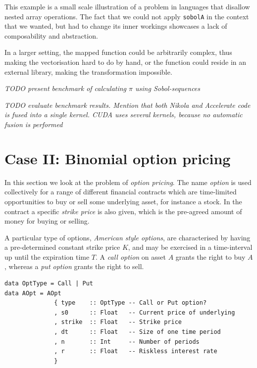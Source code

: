 \documentclass[preprint]{sigplanconf}
\begin{document}
This example is a small scale illustration of a problem in languages
that disallow nested array operations. The fact that we could not
apply \verb|sobolA| in the context that we wanted, but had to change
its inner workings showcases a lack of composability and abstraction. %

In a larger setting, the mapped function could be arbitrarily complex,
thus making the vectorisation hard to do by hand, or the function could
reside in an external library, making the transformation impossible.


\emph{TODO present benchmark of calculating $\pi$ using Sobol-sequences}

\emph{TODO evaluate benchmark results. Mention that both Nikola and
  Accelerate code is fused into a single kernel. CUDA uses several
  kernels, because no automatic fusion is performed}

\section{Case II: Binomial option pricing}
In this section we look at the problem of \emph{option pricing}. The
name \emph{option} is used collectively for a range of different
financial contracts which are time-limited opportunities to buy or
sell some underlying asset, for instance a stock. In the contract a
specific \emph{strike price} is also given, which is the pre-agreed
amount of money for buying or selling.

A particular type of options, \emph{American style options}, are
characterised by having a pre-determined constant strike price $K$,
and may be exercised in a time-interval up until the expiration time
$T$. A \emph{call option} on asset $A$ grants the right to buy $A$,
whereas a \emph{put option} grants the right to sell.

\begin{verbatim}
data OptType = Call | Put
data AOpt = AOpt
              { type    :: OptType -- Call or Put option?
              , s0      :: Float   -- Current price of underlying
              , strike  :: Float   -- Strike price
              , dt      :: Float   -- Size of one time period
              , n       :: Int     -- Number of periods
              , r       :: Float   -- Riskless interest rate
              }
\end{verbatim}
\end{document}
